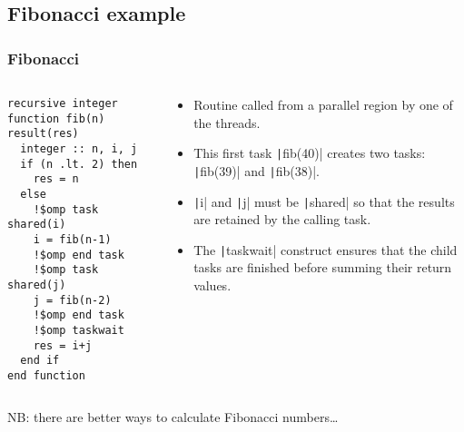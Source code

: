 \documentclass{beamer}
\begin{document}
\subsection{Fibonacci example}
\begin{frame}[fragile]
\frametitle{Fibonacci}
\begin{columns}
\begin{column}{0.5\textwidth}
\begin{verbatim}
recursive integer function fib(n) result(res)
  integer :: n, i, j
  if (n .lt. 2) then
    res = n
  else
    !$omp task shared(i)
    i = fib(n-1)
    !$omp end task
    !$omp task shared(j)
    j = fib(n-2)
    !$omp end task
    !$omp taskwait
    res = i+j
  end if
end function
\end{verbatim}
\end{column}

\begin{column}{0.5\textwidth}
\begin{itemize}
  \item Routine called from a parallel region by one of the threads.
  \item This first task \texttt|fib(40)| creates two tasks: \texttt|fib(39)| and \texttt|fib(38)|.
  \item \texttt|i| and \texttt|j| must be \texttt|shared| so that the results are retained by the calling task.
  \item The \texttt|taskwait| construct ensures that the child tasks are finished before summing their return values.
\end{itemize}
\end{column}

\end{columns}
NB: there are better ways to calculate Fibonacci numbers\dots
\end{frame}

\end{document}
